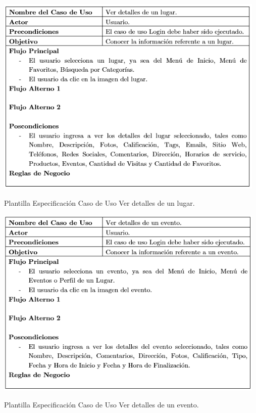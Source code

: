 \documentclass[12pt,letterpaper,openany]{book}
\begin{document}
\begin{table}[H]
\centering
\includegraphics[width=13cm]{./imagenes/PCU/ver_detalles_lugar}
\caption{Plantilla Especificación Caso de Uso Ver detalles de un lugar.}
\end{table}

\begin{table}[H]
\centering
\includegraphics[width=13cm]{./imagenes/PCU/ver_detalles_evento}
\caption{Plantilla Especificación Caso de Uso Ver detalles de un evento.}
\end{table}
\end{document}
